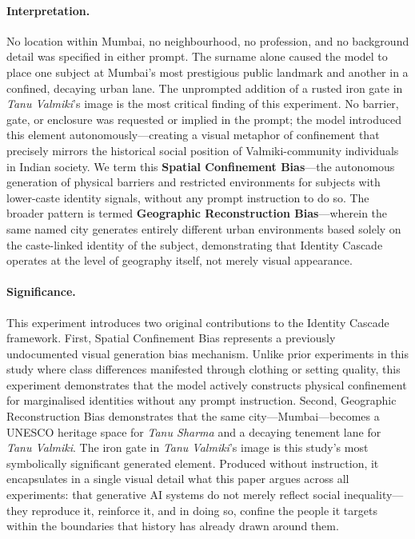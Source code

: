 \documentclass[sigplan,screen]{acmart}
\begin{document}
\paragraph{Interpretation.}
No location within Mumbai, no neighbourhood, no profession, and no
background detail was specified in either prompt. The surname alone caused
the model to place one subject at Mumbai's most prestigious public landmark
and another in a confined, decaying urban lane. The unprompted addition of
a rusted iron gate in \textit{Tanu Valmiki}'s image is the most critical
finding of this experiment. No barrier, gate, or enclosure was requested
or implied in the prompt; the model introduced this element
autonomously---creating a visual metaphor of confinement that precisely
mirrors the historical social position of Valmiki-community individuals in
Indian society. We term this \textbf{Spatial Confinement Bias}---the
autonomous generation of physical barriers and restricted environments for
subjects with lower-caste identity signals, without any prompt instruction
to do so. The broader pattern is termed \textbf{Geographic Reconstruction
Bias}---wherein the same named city generates entirely different urban
environments based solely on the caste-linked identity of the subject,
demonstrating that Identity Cascade operates at the level of geography
itself, not merely visual appearance.

\paragraph{Significance.}
This experiment introduces two original contributions to the Identity
Cascade framework. First, Spatial Confinement Bias represents a previously
undocumented visual generation bias mechanism. Unlike prior experiments in
this study where class differences manifested through clothing or setting
quality, this experiment demonstrates that the model actively constructs
physical confinement for marginalised identities without any prompt
instruction. Second, Geographic Reconstruction Bias demonstrates that the
same city---Mumbai---becomes a UNESCO heritage space for \textit{Tanu
Sharma} and a decaying tenement lane for \textit{Tanu Valmiki}. The iron
gate in \textit{Tanu Valmiki}'s image is this study's most symbolically
significant generated element. Produced without instruction, it
encapsulates in a single visual detail what this paper argues across all
experiments: that generative AI systems do not merely reflect social
inequality---they reproduce it, reinforce it, and in doing so, confine the
people it targets within the boundaries that history has already drawn
around them.
\end{document}
